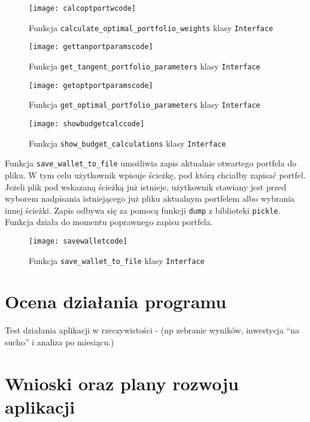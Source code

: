 \documentclass[magister]{dyplom}
\def\code#1{\texttt{#1}}
\begin{document}
\begin{figure}[ht]
	\centering
	\texttt{[image: calcoptportwcode]}
	\caption{Funkcja \code{calculate\_optimal\_portfolio\_weights} klasy \code{Interface}}
\end{figure}

\begin{figure}[h]
	\centering
	\texttt{[image: gettanportparamscode]}
	\caption{Funkcja \code{get\_tangent\_portfolio\_parameters} klasy \code{Interface}}
\end{figure}

\begin{figure}[h]
	\centering
	\texttt{[image: getoptportparamscode]}
	\caption{Funkcja \code{get\_optimal\_portfolio\_parameters} klasy \code{Interface}}
\end{figure}

\begin{figure}[h]
	\centering
	\texttt{[image: showbudgetcalccode]}
	\caption{Funkcja \code{show\_budget\_calculations} klasy \code{Interface}}
\end{figure}

\newpage
Funkcja \code{save\_wallet\_to\_file} umożliwia zapis aktualnie otwartego portfela do pliku. W tym celu użytkownik wpisuje ścieżkę, pod którą chciałby zapisać portfel. Jeżeli plik pod wskazaną ścieżką już istnieje, użytkownik stawiany jest przed wyborem nadpisania istniejącego już pliku aktualnym portfelem albo wybrania innej ścieżki. Zapis odbywa się za pomocą funkcji \code{dump} z biblioteki \code{pickle}. Funkcja działa do momentu poprawnego zapisu portfela.

\begin{figure}[h]
	\centering
	\texttt{[image: savewalletcode]}
	\caption{Funkcja \code{save\_wallet\_to\_file} klasy \code{Interface}}
\end{figure}
\chapter{Ocena działania programu}

Test działania 
aplikacji w rzeczywistości - (np zebranie wyników, inwestycja “na sucho” i analiza po miesiącu.)


\chapter{Wnioski oraz plany rozwoju aplikacji}

\appendixpage
\appendix
\end{document}
